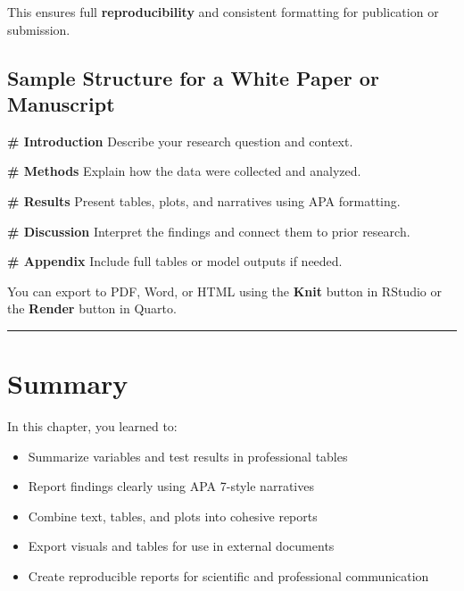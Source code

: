 \documentclass[
]{book}
\newenvironment{Shaded}{\begin{snugshade}}{\end{snugshade}}
\newcommand{\FunctionTok}[1]{\textcolor[rgb]{0.13,0.29,0.53}{\textbf{#1}}}
\newcommand{\NormalTok}[1]{#1}
\providecommand{\tightlist}{%
  \setlength{\itemsep}{0pt}\setlength{\parskip}{0pt}}
\begin{document}
This ensures full \textbf{reproducibility} and consistent formatting for publication or submission.

\subsection{Sample Structure for a White Paper or Manuscript}\label{sample-structure-for-a-white-paper-or-manuscript}

\begin{Shaded}
\begin{Highlighting}[]
\FunctionTok{\# Introduction}
\NormalTok{Describe your research question and context.}

\FunctionTok{\# Methods}
\NormalTok{Explain how the data were collected and analyzed.}

\FunctionTok{\# Results}
\NormalTok{Present tables, plots, and narratives using APA formatting.}

\FunctionTok{\# Discussion}
\NormalTok{Interpret the findings and connect them to prior research.}

\FunctionTok{\# Appendix}
\NormalTok{Include full tables or model outputs if needed.}
\end{Highlighting}
\end{Shaded}

You can export to PDF, Word, or HTML using the \textbf{Knit} button in RStudio or the \textbf{Render} button in Quarto.

\begin{center}\rule{0.5\linewidth}{0.5pt}\end{center}

\section{Summary}\label{summary-4}

In this chapter, you learned to:

\begin{itemize}
\tightlist
\item
  Summarize variables and test results in professional tables
\item
  Report findings clearly using APA 7-style narratives
\item
  Combine text, tables, and plots into cohesive reports
\item
  Export visuals and tables for use in external documents
\item
  Create reproducible reports for scientific and professional communication
\end{itemize}
\end{document}
